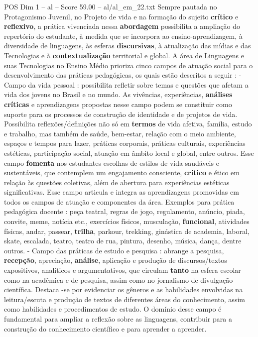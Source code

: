\begin{textsample}{POS Dim 1 – al – Score 59.00 – al/al\_em\_22.txt}
Sempre pautada no Protagonismo Juvenil, no Projeto de vida e na formação do sujeito \textbf{crítico} e \textbf{reflexivo}, a prática vivenciada nessa \textbf{abordagem} possibilita a ampliação do repertório do estudante, à medida que se incorpora ao ensino-aprendizagem, à diversidade de linguagens, às esferas \textbf{discursivas}, à atualização das mídias e das Tecnologias e à \textbf{contextualização} territorial e global.
A área de Linguagens e suas Tecnologias no Ensino Médio prioriza cinco campos de atuação social para o desenvolvimento das práticas pedagógicas, os quais estão descritos a seguir : - Campo da vida pessoal : possibilita refletir sobre temas e questões que afetam a vida dos jovens no Brasil e no mundo.
As vivências, experiências, \textbf{análises} \textbf{críticas} e aprendizagens propostas nesse campo podem se constituir como suporte para os processos de construção de identidade e de projetos de vida.
Possibilita reflexões/definições não só em \textbf{termos} de vida afetiva, família, estudo e trabalho, mas também de saúde, bem-estar, relação com o meio ambiente, espaços e tempos para lazer, práticas corporais, práticas culturais, experiências estéticas, participação social, atuação em âmbito local e global, entre outros.
Esse campo \textbf{fomenta} nos estudantes escolhas de estilos de vida saudáveis e sustentáveis, que contemplem um engajamento consciente, \textbf{crítico} e ético em relação às questões coletivas, além de abertura para experiências estéticas significativas.
Esse campo articula e integra as aprendizagens promovidas em todos os campos de atuação e componentes da área.
Exemplos para prática pedagógica docente : peça teatral, regras de jogo, regulamento, anúncio, piada, convite, meme, notícia etc., exercícios físicos, musculação, \textbf{funcional}, atividades físicas, andar, passear, \textbf{trilha}, parkour, trekking, ginástica de academia, laboral, skate, escalada, teatro, teatro de rua, pintura, desenho, música, dança, dentre outros. - Campo das práticas de estudo e pesquisa : abrange a pesquisa, \textbf{recepção}, apreciação, \textbf{análise}, aplicação e produção de discursos/textos expositivos, analíticos e argumentativos, que circulam \textbf{tanto} na esfera escolar como na acadêmica e de pesquisa, assim como no jornalismo de divulgação científica.
Destaca -se por evidenciar os gêneros e as habilidades envolvidas na leitura/escuta e produção de textos de diferentes áreas do conhecimento, assim como habilidades e procedimentos de estudo.
O domínio desse campo é fundamental para ampliar a reflexão sobre as linguagens, contribuir para a construção do conhecimento científico e para aprender a aprender.

\end{textsample}
